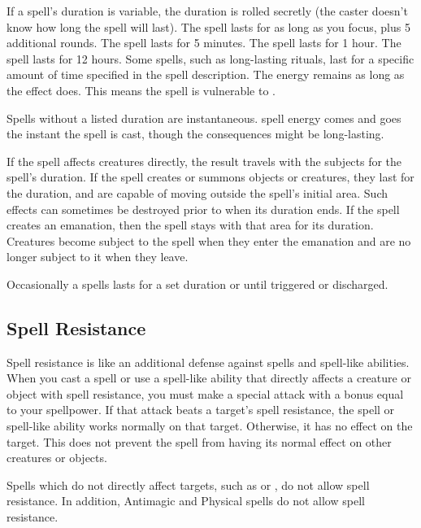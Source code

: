 If a spell's duration is variable, the duration is rolled secretly (the caster doesn't know how long the spell will last).
 The spell lasts for as long as you focus, plus 5 additional rounds.
 The spell lasts for 5 minutes.
 The spell lasts for 1 hour.
 The spell lasts for 12 hours.
 Some spells, such as long-lasting rituals, last for a specific amount of time specified in the spell description.
 The energy remains as long as the effect does. This means the spell is vulnerable to .

 Spells without a listed duration are instantaneous. spell energy comes and goes the instant the spell is cast, though the consequences might be long-lasting.

 If the spell affects creatures directly, the result travels with the subjects for the spell's duration. If the spell creates or summons objects or creatures, they last for the duration, and are capable of moving outside the spell's initial area. Such effects can sometimes be destroyed prior to when its duration ends. If the spell creates an emanation, then the spell stays with that area for its duration. Creatures become subject to the spell when they enter the emanation and are no longer subject to it when they leave.

 Occasionally a spells lasts for a set duration or until triggered or discharged.

\subsection{Spell Resistance}\label{Spell Resistance}
Spell resistance is like an additional defense against spells and spell-like abilities. When you cast a spell or use a spell-like ability that directly affects a creature or object with spell resistance, you must make a special attack with a bonus equal to your spellpower. If that attack beats a target's spell resistance, the spell or spell-like ability works normally on that target. Otherwise, it has no effect on the target. This does not prevent the spell from having its normal effect on other creatures or objects.

Spells which do not directly affect targets, such as  or , do not allow spell resistance. In addition, Antimagic and Physical spells do not allow spell resistance.

